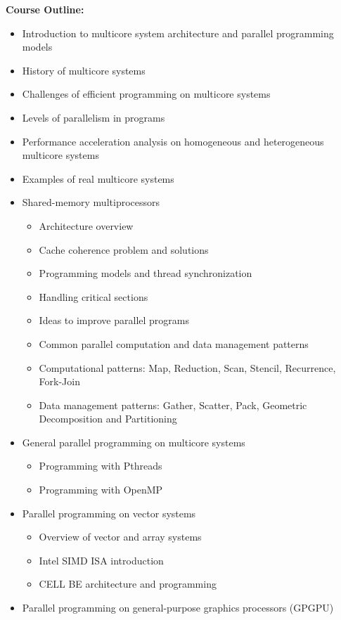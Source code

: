 \documentclass[12pt]{article}
\begin{document}
\textbf{Course Outline:}
\begin{itemize}
    \item Introduction to multicore system architecture and parallel programming models
    \item History of multicore systems
    \item Challenges of efficient programming on multicore systems
    \item Levels of parallelism in programs
    \item Performance acceleration analysis on homogeneous and heterogeneous multicore systems
    \item Examples of real multicore systems
    \item Shared-memory multiprocessors
    \begin{itemize}
        \item Architecture overview
        \item Cache coherence problem and solutions
        \item Programming models and thread synchronization
        \item Handling critical sections
        \item Ideas to improve parallel programs
        \item Common parallel computation and data management patterns
        \item Computational patterns: Map, Reduction, Scan, Stencil, Recurrence, Fork-Join
        \item Data management patterns: Gather, Scatter, Pack, Geometric Decomposition and Partitioning
    \end{itemize}
    \item General parallel programming on multicore systems
    \begin{itemize}
        \item Programming with Pthreads
        \item Programming with OpenMP
    \end{itemize}
    \item Parallel programming on vector systems
    \begin{itemize}
        \item Overview of vector and array systems
        \item Intel SIMD ISA introduction
        \item CELL BE architecture and programming
    \end{itemize}
    \item Parallel programming on general-purpose graphics processors (GPGPU)

\end{itemize}
\end{document}

